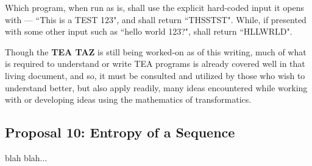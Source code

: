 \documentclass[12pt,a4paper]{article}
\begin{document}
 Which program, when run as is, shall use the explicit hard-coded input it opens with --- ``This is a TEST 123", and shall return ``THSSTST". While, if presented with some other input such as ``hello world 123?", shall return ``HLLWRLD".
 
 Though the \textbf{TEA TAZ}\cite{Lutalo2024TEATAZ} is still being worked-on as of this writing, much of what is required to understand or write TEA programs is already covered well in that living document, and so, it must be consulted and utilized by those who wish to understand better, but also apply readily, many ideas encountered while working with or developing ideas using the mathematics of transformatics.


\subsection{Proposal 10: Entropy of a Sequence\cite{lnspaper}}

blah blah...




\end{document}
